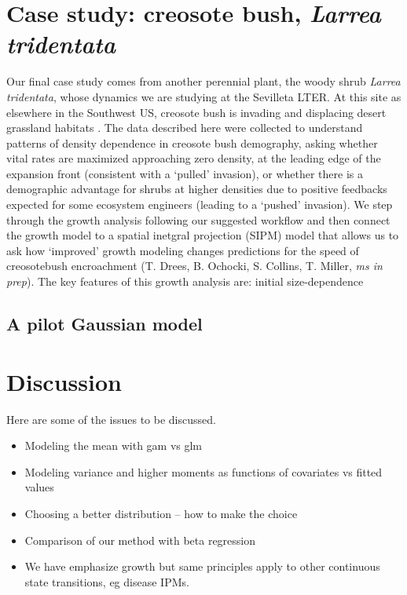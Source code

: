 \documentclass[12pt]{article}
\begin{document}
\section{Case study: creosote bush, \emph{Larrea tridentata}}
Our final case study comes from another perennial plant, the woody shrub \emph{Larrea tridentata}, whose dynamics we are studying at the Sevilleta LTER. 
At this site as elsewhere in the Southwest US, creosote bush is invading and displacing desert grassland habitats \citep{}.
The data described here were collected to understand patterns of density dependence in creosote bush demography, asking whether vital rates are maximized approaching zero density, at the leading edge of the expansion front (consistent with a `pulled' invasion), or whether there is a demographic advantage for shrubs at higher densities due to positive feedbacks expected for some ecosystem engineers (leading to a `pushed' invasion). 
We step through the growth analysis following our suggested workflow and then connect the growth model to a spatial inetgral projection (SIPM)  model that allows us to ask how `improved' growth modeling changes predictions for the speed of creosotebush encroachment (T. Drees, B. Ochocki, S. Collins, T. Miller, \textit{ms in prep}). 
The key features of this growth analysis are: initial size-dependence 

\subsection{A pilot Gaussian model}


\section{Discussion}

Here are some of the issues to be discussed.
\begin{itemize}
\item{Modeling the mean with gam vs glm}
\item{Modeling variance and higher moments as functions of covariates vs fitted values}
\item{Choosing a better distribution -- how to make the choice}
\item{Comparison of our method with beta regression}
\item{We have emphasize growth but same principles apply to other continuous state transitions, eg disease IPMs.}

\end{itemize}
\end{document}
